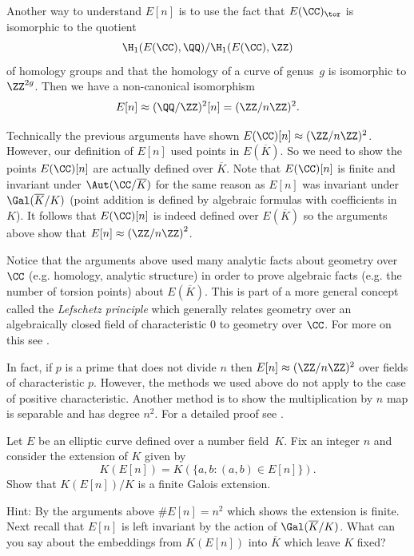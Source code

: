 Another way to understand $E[n]$ is to use the fact
that $E(\CC)_{\tor}$ is isomorphic
to the quotient
\[\H_1(E(\CC),\QQ)/\H_1(E(\CC),\ZZ)\]
of homology groups and that the homology of a curve
of genus~$g$ is isomorphic to $\ZZ^{2g}$.
Then we have a non-canonical isomorphism
\[
  E[n]\approx (\QQ/\ZZ)^2[n] = (\ZZ/n\ZZ)^2.
\]

Technically the previous arguments have shown $E(\CC)[n] \approx (\ZZ/n\ZZ)^2$.
However, our definition of $E[n]$ used points in $E(\overline{K})$.
So we need to show the points $E(\CC)[n]$ are actually defined over
$\overline{K}$. Note that $E(\CC)[n]$ is finite and invariant under
$\Aut(\CC/\overline{K})$ for the same reason as $E[n]$ was invariant under
$\Gal(\overline{K}/K)$ (point addition is defined by algebraic formulas with
coefficients in $K$). It follows that $E(\CC)[n]$ is indeed defined over
$E(\overline{K})$ so the arguments above show that
$E[n] \approx \left(\ZZ/n\ZZ\right)^2$.

\begin{remark}
  Notice that the arguments above used many analytic facts about
  geometry over $\CC$ (e.g. homology, analytic structure) in order to
  prove algebraic facts (e.g. the number of torsion points) about
  $E(\overline{K})$. This is part of a more general concept called the
  \emph{Lefschetz principle} which generally relates geometry over an
  algebraically closed field of characteristic $0$ to geometry over
  $\CC$. For more on this see \cite[Ch.~VI.6]{silverman:aec}.
\end{remark}

\begin{remark}
  In fact, if $p$ is a prime that does not divide $n$
  then $E[n] \approx (\ZZ/n\ZZ)^2$ over fields of characteristic
  $p$. However, the methods we used above do not apply
  to the case of positive characteristic. Another method is to
  show the multiplication by $n$ map is separable and has
  degree $n^2$. For a detailed proof see
  \cite[Cor.~III.6.4]{silverman:aec}.
\end{remark}

\begin{exercise}\label{QE[p]finitegaloisext}
  Let $E$ be an elliptic curve defined over a number
  field~$K$. Fix an integer $n$ and consider the
  extension of $K$ given by
  \[
    K(E[n]) = K(\{a,b \colon (a,b) \in E[n]\}).
  \]
  Show that $K(E[n])/K$ is a finite Galois extension.

  Hint: By the arguments above $\#E[n] = n^2$ which shows
  the extension is finite. Next recall that $E[n]$ is left
  invariant by the action of $\Gal(\overline{K}/K)$. What
  can you say about the embeddings from $K(E[n])$ into
  $\overline{K}$ which leave $K$ fixed?
\end{exercise}

